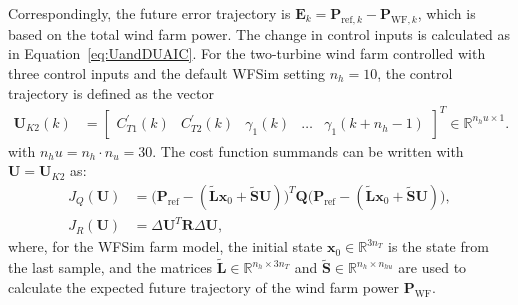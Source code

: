 Correspondingly, the future error trajectory is $\bm{E}_k = \bm{P}_{\text{ref},k} - \bm{P}_{\text{WF},k}$, which is based on the total wind farm power. The change in control inputs is calculated as in Equation~\eqref{eq:UandDUAIC}.
%
For the two-turbine wind farm controlled with three control inputs and the default WFSim setting $n_h = 10$, the control trajectory is defined as the vector
\begin{align*} 
    \bm{U}_{K2}(k) &= \begin{bmatrix} 
        C_{T1}^\prime(k) & C_{T2}^\prime(k) & \gamma_1(k) & \dots & \gamma_1(k+n_h-1) 
    \end{bmatrix}^T \in \mathbb{R}^{n_hu \times 1}.
\end{align*}
with $n_hu = n_h\cdot n_u = 30$. The cost function summands can be written with $\bm{U} = \bm{U}_{K2}$ as:
\begin{align*} 
    J_Q (\bm{U}) &= \big(\bm{P}_{\text{ref}} - (\tilde{\bm{L}} \bm{x}_0 + \tilde{\bm{S}} \bm{U})\big)^T \bm{Q} \big(\bm{P}_{\text{ref}} - (\tilde{\bm{L}} \bm{x}_0 + \tilde{\bm{S}} \bm{U})\big),\\
    J_R (\bm{U}) &= \Delta \bm{U}^T \bm{R} \Delta \bm{U},
\end{align*}
where, for the WFSim farm model, the initial state $\bm{x}_0 \in \mathbb{R}^{3 n_T}$ is the state from the last sample, and the matrices $\tilde{\bm{L}} \in \mathbb{R}^{n_h \times 3 n_T}$ and $\tilde{\bm{S}} \in \mathbb{R}^{n_h \times n_{hu}}$ are used to calculate the expected future trajectory of the wind farm power $\bm{P}_{\text{WF}}$.

